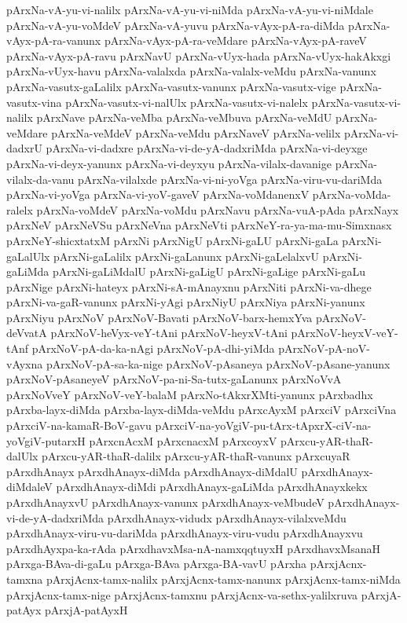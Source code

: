 {pArxNa-vA-yu-vi-nalilx
pArxNa-vA-yu-vi-niMda
pArxNa-vA-yu-vi-niMdale
pArxNa-vA-yu-voMdeV
pArxNa-vA-yuvu
pArxNa-vAyx-pA-ra-diMda
pArxNa-vAyx-pA-ra-vanunx
pArxNa-vAyx-pA-ra-veMdare
pArxNa-vAyx-pA-raveV
pArxNa-vAyx-pA-ravu
pArxNavU
pArxNa-vUyx-hada
pArxNa-vUyx-hakAkxgi
pArxNa-vUyx-havu
pArxNa-valalxda
pArxNa-valalx-veMdu
pArxNa-vanunx
pArxNa-vasutx-gaLalilx
pArxNa-vasutx-vanunx
pArxNa-vasutx-vige
pArxNa-vasutx-vina
pArxNa-vasutx-vi-nalUlx
pArxNa-vasutx-vi-nalelx
pArxNa-vasutx-vi-nalilx
pArxNave
pArxNa-veMba
pArxNa-veMbuva
pArxNa-veMdU
pArxNa-veMdare
pArxNa-veMdeV
pArxNa-veMdu
pArxNaveV
pArxNa-velilx
pArxNa-vi-dadxrU
pArxNa-vi-dadxre
pArxNa-vi-de-yA-dadxriMda
pArxNa-vi-deyxge
pArxNa-vi-deyx-yanunx
pArxNa-vi-deyxyu
pArxNa-vilalx-davanige
pArxNa-vilalx-da-vanu
pArxNa-vilalxde
pArxNa-vi-ni-yoVga
pArxNa-viru-vu-dariMda
pArxNa-vi-yoVga
pArxNa-vi-yoV-gaveV
pArxNa-voMdanenxV
pArxNa-voMda-ralelx
pArxNa-voMdeV
pArxNa-voMdu
pArxNavu
pArxNa-vuA-pAda
pArxNayx
pArxNeV
pArxNeVSu
pArxNeVna
pArxNeVti
pArxNeY-ra-ya-ma-mu-Simxnasx
pArxNeY-shicxtatxM
pArxNi
pArxNigU
pArxNi-gaLU
pArxNi-gaLa
pArxNi-gaLalUlx
pArxNi-gaLalilx
pArxNi-gaLanunx
pArxNi-gaLelalxvU
pArxNi-gaLiMda
pArxNi-gaLiMdalU
pArxNi-gaLigU
pArxNi-gaLige
pArxNi-gaLu
pArxNige
pArxNi-hateyx
pArxNi-sA-mAnayxnu
pArxNiti
pArxNi-va-dhege
pArxNi-va-gaR-vanunx
pArxNi-yAgi
pArxNiyU
pArxNiya
pArxNi-yanunx
pArxNiyu
pArxNoV
pArxNoV-Bavati
pArxNoV-barx-hemxYva
pArxNoV-deVvatA
pArxNoV-heVyx-veY-tAni
pArxNoV-heyxV-tAni
pArxNoV-heyxV-veY-tAnf
pArxNoV-pA-da-ka-nAgi
pArxNoV-pA-dhi-yiMda
pArxNoV-pA-noV-vAyxna
pArxNoV-pA-sa-ka-nige
pArxNoV-pAsaneya
pArxNoV-pAsane-yanunx
pArxNoV-pAsaneyeV
pArxNoV-pa-ni-Sa-tutx-gaLanunx
pArxNoVvA
pArxNoVveY
pArxNoV-veY-balaM
pArxNo-tAkxrXMti-yanunx
pArxbadhx
pArxba-layx-diMda
pArxba-layx-diMda-veMdu
pArxcAyxM
pArxciV
pArxciVna
pArxciV-na-kamaR-BoV-gavu
pArxciV-na-yoVgiV-pu-tArx-tApxrX-ciV-na-yoVgiV-putarxH
pArxcnAcxM
pArxcnacxM
pArxcoyxV
pArxcu-yAR-thaR-dalUlx
pArxcu-yAR-thaR-dalilx
pArxcu-yAR-thaR-vanunx
pArxcuyaR
pArxdhAnayx
pArxdhAnayx-diMda
pArxdhAnayx-diMdalU
pArxdhAnayx-diMdaleV
pArxdhAnayx-diMdi
pArxdhAnayx-gaLiMda
pArxdhAnayxkekx
pArxdhAnayxvU
pArxdhAnayx-vanunx
pArxdhAnayx-veMbudeV
pArxdhAnayx-vi-de-yA-dadxriMda
pArxdhAnayx-vidudx
pArxdhAnayx-vilalxveMdu
pArxdhAnayx-viru-vu-dariMda
pArxdhAnayx-viru-vudu
pArxdhAnayxvu
pArxdhAyxpa-ka-rAda
pArxdhavxMsa-nA-namxqqtuyxH
pArxdhavxMsanaH
pArxga-BAva-di-gaLu
pArxga-BAva
pArxga-BA-vavU
pArxha
pArxjAcnx-tamxna
pArxjAcnx-tamx-nalilx
pArxjAcnx-tamx-nanunx
pArxjAcnx-tamx-niMda
pArxjAcnx-tamx-nige
pArxjAcnx-tamxnu
pArxjAcnx-va-sethx-yalilxruva
pArxjA-patAyx
pArxjA-patAyxH
}
